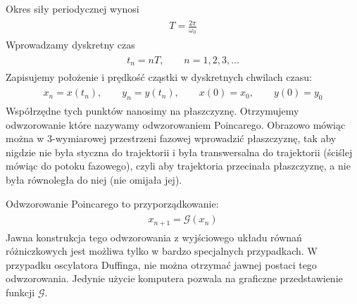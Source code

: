 \documentclass[a4paper,12pt,polish]{sphinxmanual}
\begin{document}
Okres siły periodycznej wynosi
\label{ch2/chII012:equation-eqn29}\begin{gather}
\begin{split}T = \frac{2\pi}{\omega_0}\end{split}\label{ch2/chII012-eqn29}
\end{gather}
Wprowadzamy dyskretny czas
\label{ch2/chII012:equation-eqn30}\begin{gather}
\begin{split}t_n = n T, \qquad n=1,  2,  3,  ...\end{split}\label{ch2/chII012-eqn30}
\end{gather}
Zapisujemy położenie i prędkość cząstki w dyskretnych chwilach czasu:
\label{ch2/chII012:equation-eqn31}\begin{gather}
\begin{split} x_n = x(t_n), \qquad y_n = y(t_n), \qquad x(0) = x_0, \qquad y(0) = y_0\end{split}\label{ch2/chII012-eqn31}
\end{gather}
Współrzędne tych punktów nanosimy na płaszczyznę. Otrzymujemy odwzorowanie które nazywamy odwzorowaniem Poincarego. Obrazowo mówiąc można w 3-wymiarowej przestrzeni fazowej wprowadzić płaszczyznę, tak aby nigdzie nie była styczna do trajektorii i była transwersalna do trajektorii (ściślej mówiąc do potoku fazowego), czyli aby trajektoria przecinała płaszczyznę, a nie była równoległa do niej (nie omijała jej).

Odwzorowanie Poincarego to przyporządkowanie:
\label{ch2/chII012:equation-eqn32}\begin{gather}
\begin{split}x_{n+1} = \mathcal{G}(x_n)\end{split}\label{ch2/chII012-eqn32}
\end{gather}
Jawna konstrukcja tego odwzorowania z wyjściowego układu równań  różniczkowych jest możliwa tylko w bardzo specjalnych przypadkach. W przypadku oscylatora Duffinga, nie można otrzymać jawnej postaci tego odwzorowania. Jedynie użycie komputera pozwala na graficzne przedstawienie funkcji $\mathcal{G}$.
\end{document}
